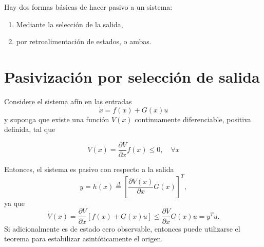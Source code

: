 Hay dos formas básicas de hacer pasivo a un sistema:
\begin{enumerate}
	\item Mediante la selección de la salida,
	\item por retroalimentación de estados, o ambas.
\end{enumerate}

\section{Pasivización por selección de salida}
Considere el sistema afín en las entradas
\begin{equation}
    \dot{x} = f(x) + G(x)u
    \label{eq:sistema_af}
\end{equation}
y suponga que existe una función $V(x)$ continuamente diferenciable, positiva definida, tal que 

\begin{equation*}
    \dot{V}(x) = \frac{\partial V}{\partial x} f(x) \leq 0, \quad \forall x
\end{equation*}

Entonces, el sistema es pasivo con respecto a la salida
\begin{equation*}
    y = h(x) \overset{\Delta}{=} \left[ \dfrac{\partial V(x)}{\partial x} G(x) \right]^T,
\end{equation*}
ya que
\begin{equation*}
    \dot{V}(x) = \frac{\partial V}{\partial x} [ f(x) + G(x)u] \leq \frac{\partial V}{\partial x} G(x)u = y^T u .
\end{equation*}
Si adicionalmente es de estado cero observable, entonces puede utilizarse el teorema para estabilizar asintóticamente el origen.

